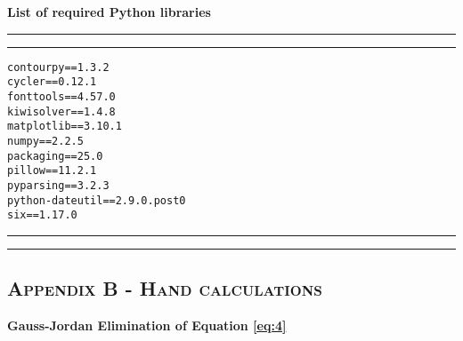 \textbf{\large{List of required Python libraries}}
\vspace{2.5pt}
\hrule
\vspace{1mm}
\hrule
\begin{lstlisting}
contourpy==1.3.2
cycler==0.12.1
fonttools==4.57.0
kiwisolver==1.4.8
matplotlib==3.10.1
numpy==2.2.5
packaging==25.0
pillow==11.2.1
pyparsing==3.2.3
python-dateutil==2.9.0.post0
six==1.17.0
\end{lstlisting}
\hrule
\vspace{1mm}
\hrule

\pagebreak
\subsection*{\centering\textsc{Appendix B - Hand calculations}}
\textbf{\large{Gauss-Jordan Elimination of Equation \ref{eq:4}}}
\vspace{2.5pt}

